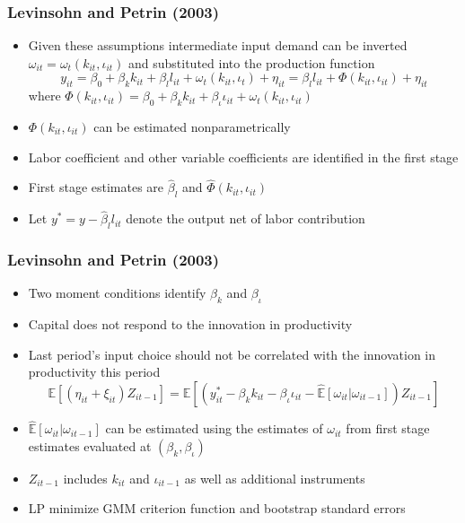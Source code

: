 \documentclass{beamer}
\begin{document}
\begin{frame}
\frametitle{Levinsohn and Petrin (2003)}
\begin{itemize}
	\item Given these assumptions intermediate input demand can be inverted $\omega_{it}=\omega_{t}(k_{it}, \iota_{it})$ and substituted into the production function
	\begin{equation}
		y_{it}=\beta_{0}+\beta_{k}k_{it}+\beta_{l}l_{it}+\omega_{t}(k_{it}, \iota_{t})+\eta_{it}=\beta_{l}l_{it}+\Phi(k_{it}, \iota_{it})+\eta_{it}
	\end{equation}
	where $\Phi(k_{it}, \iota_{it})=\beta_{0}+\beta_{k}k_{it}+\beta_{\iota}\iota_{it}+\omega_{t}(k_{it}, \iota_{it})$
	\item $\Phi(k_{it}, \iota_{it})$ can be estimated nonparametrically
	\item Labor coefficient and other variable coefficients are identified in the first stage
	\item First stage estimates are $\hat{\beta}_{l}$ and $\hat{\Phi}(k_{it}, \iota_{it})$ 
	\item Let $y^{*}=y-\hat{\beta}_{l}l_{it}$ denote the output net of labor contribution
\end{itemize}
\end{frame}


\begin{frame}
\frametitle{Levinsohn and Petrin (2003)}
\begin{itemize}
	\item Two moment conditions identify $\beta_{k}$ and $\beta_{\iota}$
	\item Capital does not respond to the innovation in productivity 
	\item Last period's input choice should not be correlated with the innovation in productivity this period
	\begin{equation}
	\mathbb{E}[(\eta_{it}+\xi_{it})Z_{it-1}]=\mathbb{E}[(y_{it}^{*}-\beta_{k}k_{it}-\beta_{\iota}\iota_{it}-\hat{\mathbb{E}}[\omega_{it}|\omega_{it-1}])Z_{it-1}]
	\end{equation}
	\item $\hat{\mathbb{E}}[\omega_{it}|\omega_{it-1}]$ can be estimated using the estimates of $\omega_{it}$ from first stage estimates evaluated at $(\beta_{k}, \beta_{\iota})$
	\item $Z_{it-1}$ includes $k_{it}$ and $\iota_{it-1}$ as well as additional instruments
	\item LP minimize GMM criterion function and bootstrap standard errors 
\end{itemize}
\end{frame}
\end{document}
